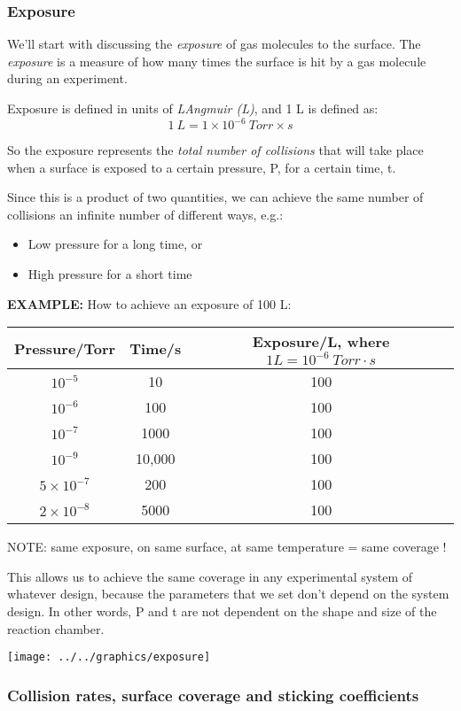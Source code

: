 \documentclass[ignorenonframetext]{beamer}
\begin{document}
\subsubsection{Exposure}
We'll start with discussing the \emph{exposure} of gas molecules to the surface. The \textit{exposure} is a measure of how many times the surface is hit by a gas molecule during an experiment. 

Exposure is defined in units of \textit{LAngmuir (L)}, and 1 L is defined as: \[1\ L = 1\times10^{-6}\ Torr\times s\]

So the exposure represents the \textit{total number of collisions} that will take place when a surface is exposed to a certain pressure, P, for a certain time, t.

Since this is a product of two quantities, we can achieve the same number of collisions an infinite number of different ways, e.g.:

\begin{itemize}
\item Low pressure for a long time, or
\item High pressure for a short time
\end{itemize}

\textbf{EXAMPLE:} How to achieve an exposure of 100 L:

\begin{tabular}{c|c|c}
Pressure/Torr & Time/s & Exposure/L, where \(1L = 10^{-6}\ Torr\cdot s\)\\\hline
\(10^{-5}\) & 10 & 100\\
\(10^{-6}\) & 100 & 100\\
\(10^{-7}\) & 1000 & 100\\
\(10^{-9}\) & 10,000 & 100\\
\(5\times10^{-7}\) & 200 & 100\\
\(2\times10^{-8}\) & 5000 & 100\\\hline
\end{tabular}

NOTE: same exposure, on same surface, at same temperature = same coverage !

This allows us to achieve the same coverage in any experimental system of whatever design, because the parameters that we set don't depend on the system design. In other words, P and t are not dependent on the shape and size of the reaction chamber.

\texttt{[image: ../../graphics/exposure]}

\subsubsection{Collision rates, surface coverage and sticking coefficients}
\end{document}

